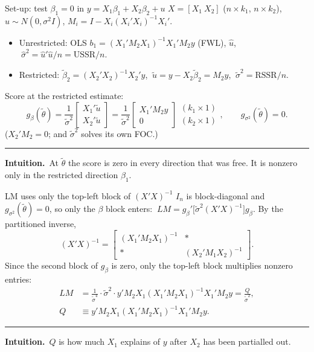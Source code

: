 \documentclass[aspectratio=169,11pt,t]{beamer}
\newcommand{\In}{I_{n}}                %
\newcommand{\tth}{\tilde\theta}
\newcommand{\intuition}[1]{\par\vfill
  {\color{intu}\rule{\linewidth}{0.4pt}}\par\vspace{1pt}
  {\small\color{intu}\textbf{Intuition.}\ #1}\par\vspace{2pt}}
\begin{document}
\begin{frame}{Set-up: test $\beta_{1}=0$ in $y=X_{1}\beta_{1}+X_{2}\beta_{2}+u$}
$X=[X_{1}\ X_{2}]$ ($n\times k_{1}$, $n\times k_{2}$), $u\sim N(0,\sigma^{2}I)$, $M_{i}=I-X_{i}(X_{i}'X_{i})^{-1}X_{i}'$.
\begin{itemize}
 \item Unrestricted: OLS $b_{1}=(X_{1}'M_{2}X_{1})^{-1}X_{1}'M_{2}y$ (FWL), $\hat u$, $\ \hat\sigma^{2}=\hat u'\hat u/n=\mathrm{USSR}/n$.
 \item Restricted: $\tilde\beta_{2}=(X_{2}'X_{2})^{-1}X_{2}'y$, $\ \tilde u=y-X_{2}\tilde\beta_{2}=M_{2}y$, $\ \tilde\sigma^{2}=\mathrm{RSSR}/n$.
\end{itemize}
Score at the restricted estimate:
\[ g_{\beta}(\tth)=\frac{1}{\tilde\sigma^{2}}\begin{bmatrix}X_{1}'\tilde u\\ X_{2}'\tilde u\end{bmatrix}
 =\frac{1}{\tilde\sigma^{2}}\begin{bmatrix}X_{1}'M_{2}y\\ 0\end{bmatrix}
 \begin{matrix}(k_{1}\times1)\\(k_{2}\times1)\end{matrix},
 \qquad g_{\sigma^{2}}(\tth)=0 . \]
($X_{2}'M_{2}=0$; and $\tilde\sigma^{2}$ solves its own FOC.)
\intuition{At $\tth$ the score is zero in every direction that was free. It is nonzero only in the restricted direction $\beta_{1}$.}
\end{frame}

\begin{frame}{LM uses only the top-left block of $(X'X)^{-1}$}
$\In$ is block-diagonal and $g_{\sigma^{2}}(\tth)=0$, so only the $\beta$ block enters: $\ LM=g_{\beta}'\bigl[\tilde\sigma^{2}(X'X)^{-1}\bigr]g_{\beta}$. By the partitioned inverse,
\[ (X'X)^{-1}=\begin{bmatrix}(X_{1}'M_{2}X_{1})^{-1} & \ast\\ \ast & (X_{2}'M_{1}X_{2})^{-1}\end{bmatrix}. \]
Since the second block of $g_{\beta}$ is zero, only the top-left block multiplies nonzero entries:
\begin{align*}
 LM&=\frac{1}{\tilde\sigma^{4}}\cdot\tilde\sigma^{2}\cdot y'M_{2}X_{1}(X_{1}'M_{2}X_{1})^{-1}X_{1}'M_{2}y=\frac{Q}{\tilde\sigma^{2}},\\
 Q&\equiv y'M_{2}X_{1}(X_{1}'M_{2}X_{1})^{-1}X_{1}'M_{2}y .
\end{align*}
\intuition{$Q$ is how much $X_{1}$ explains of $y$ after $X_{2}$ has been partialled out.}
\end{frame}
\end{document}
